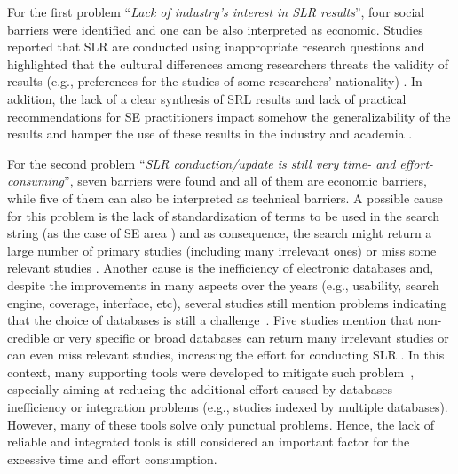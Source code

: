 \documentclass{article}
\begin{document}



For the first problem ``\textit{Lack of industry's interest in SLR results}'', four social barriers were identified and one can be also interpreted as economic. Studies reported that SLR are conducted using inappropriate research questions \cite{Ampatzoglou2019,Imtiaz2013,Kitchenham2013,Riaz2010,Zhou2016Threats} and highlighted that the cultural differences among researchers threats the validity of results (e.g., preferences for the studies of some researchers' nationality) \cite{Zhou2016Threats,Riaz2010}. In addition, the lack of a clear synthesis of SRL results and lack of practical recommendations for SE practitioners impact somehow the generalizability of the results and hamper the use of these results in the industry and academia \cite{Budgen2018Reporting,Ampatzoglou2019}.

For the second problem ``\textit{SLR conduction/update is still very time- and effort-consuming}'', seven barriers were found and all of them are economic barriers, while five of them can also be interpreted as technical barriers. A possible cause for this problem is the lack of standardization of terms to be used in the search string (as the case of SE area \cite{Zhou2016Threats,Ampatzoglou2019,Kitchenham2013,Riaz2010,Imtiaz2013}) and as consequence, the search might return a large number of primary studies (including many irrelevant ones) or miss some relevant studies \cite{Ampatzoglou2019}. Another cause is the inefficiency of electronic databases \cite{Imtiaz2013,Riaz2010,Kitchenham2013} and, despite the improvements in many aspects over the years (e.g., usability, search engine, coverage, interface, etc), several studies still mention problems indicating that the choice of databases is still a challenge~\cite{Ampatzoglou2019}. Five studies mention that non-credible or very specific or broad databases can return many irrelevant studies or can even miss relevant studies, increasing the effort for conducting SLR \cite{Zhou2016Threats,Ampatzoglou2019,Kitchenham2013,Imtiaz2013,Riaz2010}. In this context, many supporting tools were developed to mitigate such problem~\cite{Marshall2015}, especially aiming at reducing the additional effort caused by databases inefficiency or integration problems (e.g., studies indexed by multiple databases). However, many of these tools solve only punctual problems. Hence, the lack of reliable and integrated tools is still considered an important factor for the excessive time and effort consumption.
\end{document}
